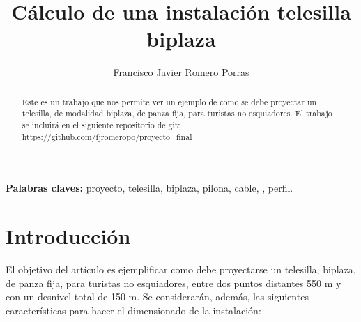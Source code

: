 \documentclass[a4paper,11pt]{article}
\begin{document}
\allsectionsfont{\normalsize}
\title{Cálculo de una instalación telesilla biplaza}
\author{Francisco Javier Romero Porras}
\maketitle
\begin{abstract}
Este es un trabajo que nos permite ver un ejemplo de como se debe proyectar un telesilla, de modalidad biplaza, de panza fija, para turistas no esquiadores. El trabajo se incluirá en el siguiente repositorio de git:\\
\url{https://github.com/fjromeropo/proyecto_final}
\end{abstract}
\textbf{Palabras claves:} proyecto, telesilla, biplaza, pilona, cable, , perfil.
\tableofcontents
\part{Introducción}
El objetivo del artículo es ejemplificar como debe proyectarse un telesilla, biplaza, de panza fija, para turistas no esquiadores, entre dos puntos distantes 550 m y con un desnivel total de 150 m. Se considerarán, además, las siguientes características para hacer el dimensionado de la instalación:\\
\end{document}
